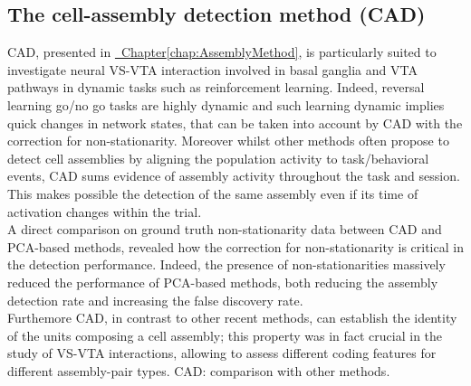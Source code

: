 \subsection{The cell-assembly detection method (CAD)}
CAD, presented in \hyperref[chap:AssemblyMethod]{~Chapter\ref*{chap:AssemblyMethod}}, is particularly suited to investigate neural VS-VTA interaction involved in basal ganglia and VTA pathways in dynamic tasks such as reinforcement learning. Indeed, reversal learning go/no go tasks are highly dynamic and such learning dynamic implies quick changes in network states, that can be taken into account by CAD with the correction for non-stationarity. Moreover whilst other methods often propose to detect cell assemblies by aligning the population activity to task/behavioral events, CAD sums evidence of assembly activity throughout the task and session. This makes possible the detection of the same assembly even if its time of activation changes within the trial.\\A direct comparison on ground truth non-stationarity data between CAD and PCA-based methods, revealed how the correction for non-stationarity is critical in the detection performance. Indeed, the presence of non-stationarities massively reduced the performance of PCA-based methods, both reducing the assembly detection rate and increasing the false discovery rate.\\Furthemore CAD, in contrast to other recent methods, can establish the identity of the units composing a cell assembly; this property was in fact crucial in the study of VS-VTA interactions, allowing to assess different coding features for different assembly-pair types.
CAD: comparison with other methods.
